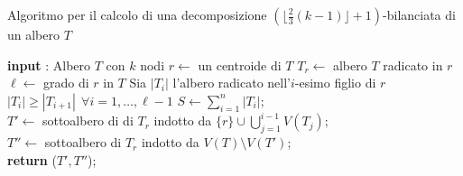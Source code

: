 \begin{algorithm}[H]
	\label{algoritmo1}
	\SetAlgoLined
	\caption{Algoritmo per il calcolo di una decomposizione $ (\lfloor \frac{2}{3}(k-1) \rfloor + 1)$-bilanciata di un albero $T$ }
	\textbf{input} : Albero $ T $ con $ k $ nodi\;
	$r \gets $ un centroide di $T$\;
	$T_r \gets $ albero $T$ radicato in $r$\;
	$\ell \gets$ grado di $r$ in $T$\; 
	Sia $ |T_i| $ l'albero radicato nell'$ i $-esimo figlio di $ r $\;
	$ |T_{i}|\ge |T_{i+1}| \ \ \forall {i = 1,\dots, \ell-1} $\;
	$ S \gets \sum_{i=1}^{n}|T_i| $;\\
	{
		{
			$ T'\gets $ sottoalbero di  di $ T_r $ indotto da $ \{r\} \cup \bigcup_{j=1}^{i-1}V(T_j)$;\\ %
			$ T'' \gets $ sottoalbero di $ T_r $ indotto da $ V(T) \setminus V(T')$;\\ 
			\textbf{return} ($ T',T'' $);\\
		}	 
}
\end{algorithm}



